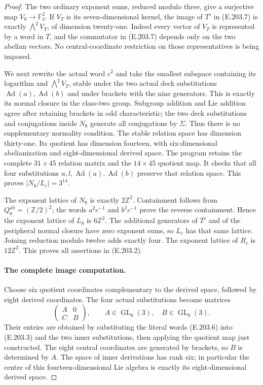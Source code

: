 \begin{proof}
The two ordinary exponent sums, reduced modulo three, give a
surjective map $V_9\to\mathbb F_3^2$.  If $V_T$ is its
seven-dimensional kernel, the image of $T'$ in (E.203.7) is
exactly $\bigwedge^2V_T$, of dimension twenty-one.  Indeed every
vector of $V_T$ is represented by a word in $T$, and the
commutator in (E.203.7) depends only on the two abelian vectors.
No central-coordinate restriction on those representatives is
being imposed.

We next rewrite the actual word $c^2$ and take the smallest
subspace containing its logarithm and $\bigwedge^2V_T$, stable
under the two actual deck substitutions
$\operatorname{Ad}(a),\operatorname{Ad}(b)$ and under brackets
with the nine generators.  This is exactly its normal closure in
the class-two group.  Subgroup addition and Lie addition agree
after retaining brackets in odd characteristic; the two deck
substitutions and conjugations inside $N_8$ generate all
conjugations by $\Sigma$.  Thus there is no supplementary
normality condition.  The stable relation space has dimension
thirty-one.  Its quotient has dimension fourteen, with
six-dimensional abelianization and eight-dimensional derived
space.  The program retains the complete $31\times45$ relation
matrix and the $14\times45$ quotient map.  It checks that all
four substitutions $u,l,\operatorname{Ad}(a),\operatorname{Ad}(b)$
preserve that relation space.  This proves
$|N_8/L_c|=3^{14}$.

The exponent lattice of $N_8$ is exactly $2\mathbb Z^2$.
Containment follows from $Q_8^{\mathrm{ab}}=(\mathbb Z/2)^2$;
the words $a^2c^{-1}$ and $b^2c^{-1}$ prove the reverse
containment.  Hence the exponent lattice of $L_8$ is
$6\mathbb Z^2$.  The additional generators of $T'$ and of the
peripheral normal closure have zero exponent sums, so $L_c$ has
that same lattice.  Joining reduction modulo twelve adds
exactly four.  The exponent lattice of $R_c$ is
$12\mathbb Z^2$.  This proves all assertions in (E.203.2).

\paragraph{The complete image computation.}
Choose six quotient coordinates complementary to the derived
space, followed by eight derived coordinates.  The four actual
substitutions become matrices
\[
                  \begin{pmatrix}A&0\\ C&B\end{pmatrix},
          \qquad A\in\operatorname{GL}_6(3),\quad
                 B\in\operatorname{GL}_8(3).                    \tag{E.203.8}
\]
Their entries are obtained by substituting the literal words
(E.203.6) into (E.203.3) and the two inner substitutions, then
applying the quotient map just constructed.  The eight central
coordinates are generated by brackets, so $B$ is determined by
$A$.  The space of inner derivations has rank six; in particular
the centre of this fourteen-dimensional Lie algebra is exactly
its eight-dimensional derived space.


\end{proof}
